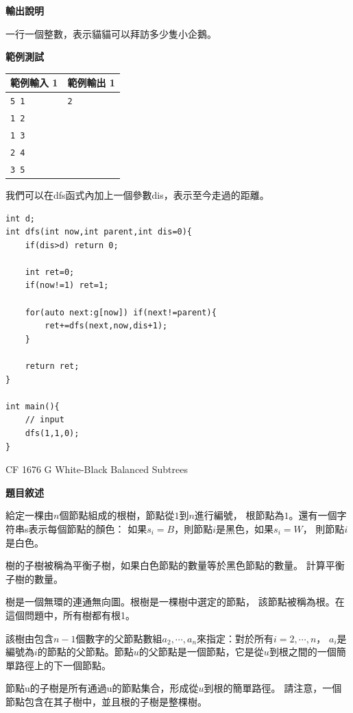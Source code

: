     \textbf{輸出說明}

    一行一個整數，表示貓貓可以拜訪多少隻小企鵝。

    \textbf{範例測試}

    \begin{tabular}{|m{7cm}|m{7cm}|}
        \hline
        範例輸入 1 & 範例輸出 1 \\
        \hline
        \verb|5 1| & \verb|2| \\
        \verb|1 2| & \\
        \verb|1 3| & \\
        \verb|2 4| & \\
        \verb|3 5| & \\
        \hline
    \end{tabular}

    我們可以在dfs函式內加上一個參數dis，表示至今走過的距離。

\begin{lstlisting}[caption=貓貓和企鵝題解]
int d;
int dfs(int now,int parent,int dis=0){
    if(dis>d) return 0;

    int ret=0;
    if(now!=1) ret=1;

    for(auto next:g[now]) if(next!=parent){
        ret+=dfs(next,now,dis+1);
    }

    return ret;
}

int main(){
    // input
    dfs(1,1,0);
}
\end{lstlisting}

    \problem CF 1676 G White-Black Balanced Subtrees

    \textbf{題目敘述}

    給定一棵由$n$個節點組成的根樹，節點從$1$到$n$進行編號，
    根節點為$1$。還有一個字符串s表示每個節點的顏色：
    如果$s_i=B$，則節點$i$是黑色，如果$s_i=W$，
    則節點$i$是白色。

    樹的子樹被稱為平衡子樹，如果白色節點的數量等於黑色節點的數量。
    計算平衡子樹的數量。

    樹是一個無環的連通無向圖。根樹是一棵樹中選定的節點，
    該節點被稱為根。在這個問題中，所有樹都有根1。

    該樹由包含$n-1$個數字的父節點數組$a_2,\cdots,a_n$來指定：對於所有$i=2,\cdots,n$，
    $a_i$是編號為$i$的節點的父節點。節點$u$的父節點是一個節點，它是從$u$到根之間的一個簡單路徑上的下一個節點。

    節點u的子樹是所有通過u的節點集合，形成從$u$到根的簡單路徑。
    請注意，一個節點包含在其子樹中，並且根的子樹是整棵樹。

